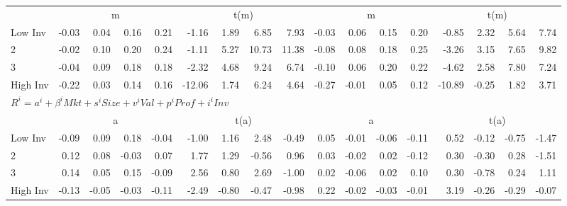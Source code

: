 \begin{table}[!ht]
\begin{tabular}{lrrrrrrrrrrrrrrrr}
  
     & \multicolumn{4}{c}{m} & \multicolumn{4}{c}{t(m)}  & \multicolumn{4}{c}{m} & \multicolumn{4}{c}{t(m)}   \\
     \cmidrule(r){2-5} \cmidrule(r){6-9}  \cmidrule(r){10-13} \cmidrule(r){14-17} 
    Low Inv  & -0.03  & 0.04  & 0.16  & 0.21  & -1.16  & 1.89  & 6.85  & 7.93  & -0.03  & 0.06  & 0.15  & 0.20  & -0.85  & 2.32  & 5.64  & 7.74   \\
    2  & -0.02  & 0.10  & 0.20  & 0.24  & -1.11  & 5.27  & 10.73  & 11.38  & -0.08  & 0.08  & 0.18  & 0.25  & -3.26  & 3.15  & 7.65  & 9.82   \\
    3  & -0.04  & 0.09  & 0.18  & 0.18  & -2.32  & 4.68  & 9.24  & 6.74  & -0.10  & 0.06  & 0.20  & 0.22  & -4.62  & 2.58  & 7.80  & 7.24   \\
    High Inv  & -0.22  & 0.03  & 0.14  & 0.16  & -12.06  & 1.74  & 6.24  & 4.64  & -0.27  & -0.01  & 0.05  & 0.12  & -10.89  & -0.25  & 1.82  & 3.71   \\

  \midrule
  \multicolumn{17}{l}{$R^i=a^i+\beta^iMkt+s^iSize+v^iVal+p^iProf+i^iInv$}  \\
  
     & \multicolumn{4}{c}{a} & \multicolumn{4}{c}{t(a)}  & \multicolumn{4}{c}{a} & \multicolumn{4}{c}{t(a)}   \\
     \cmidrule(r){2-5} \cmidrule(r){6-9}  \cmidrule(r){10-13} \cmidrule(r){14-17} 
    Low Inv  & -0.09  & 0.09  & 0.18  & -0.04  & -1.00  & 1.16  & 2.48  & -0.49  & 0.05  & -0.01  & -0.06  & -0.11  & 0.52  & -0.12  & -0.75  & -1.47   \\
    2  & 0.12  & 0.08  & -0.03  & 0.07  & 1.77  & 1.29  & -0.56  & 0.96  & 0.03  & -0.02  & 0.02  & -0.12  & 0.30  & -0.30  & 0.28  & -1.51   \\
    3  & 0.14  & 0.05  & 0.15  & -0.09  & 2.56  & 0.80  & 2.69  & -1.00  & 0.02  & -0.06  & 0.02  & 0.10  & 0.30  & -0.78  & 0.24  & 1.11   \\
    High Inv  & -0.13  & -0.05  & -0.03  & -0.11  & -2.49  & -0.80  & -0.47  & -0.98  & 0.22  & -0.02  & -0.03  & -0.01  & 3.19  & -0.26  & -0.29  & -0.07   \\




\end{tabular}
\end{table}
